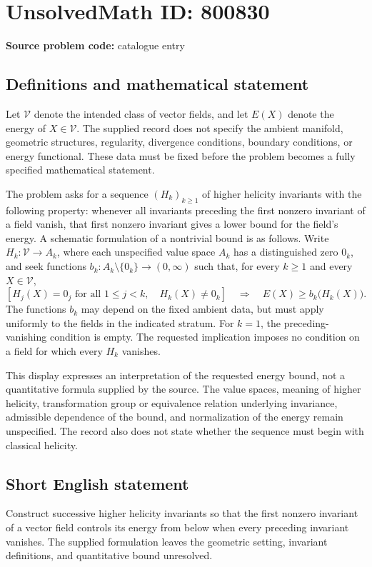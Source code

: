 \documentclass[11pt]{article}
\begin{document}
\section*{UnsolvedMath ID: 800830}
\textbf{Source problem code:} catalogue entry
\subsection{Definitions and mathematical statement}
Let \(\mathcal V\) denote the intended class of vector fields, and let \(E(X)\) denote the energy of \(X\in\mathcal V\). The supplied record does not specify the ambient manifold, geometric structures, regularity, divergence conditions, boundary conditions, or energy functional. These data must be fixed before the problem becomes a fully specified mathematical statement.

The problem asks for a sequence \((H_k)_{k\geq 1}\) of higher helicity invariants with the following property: whenever all invariants preceding the first nonzero invariant of a field vanish, that first nonzero invariant gives a lower bound for the field's energy. A schematic formulation of a nontrivial bound is as follows. Write \(H_k:\mathcal V\to A_k\), where each unspecified value space \(A_k\) has a distinguished zero \(0_k\), and seek functions \(b_k:A_k\setminus\{0_k\}\to(0,\infty)\) such that, for every \(k\geq 1\) and every \(X\in\mathcal V\),
\[
\left[H_j(X)=0_j\text{ for all }1\leq j<k,\quad H_k(X)\neq 0_k\right]
\quad\Longrightarrow\quad
E(X)\geq b_k\bigl(H_k(X)\bigr).
\]
The functions \(b_k\) may depend on the fixed ambient data, but must apply uniformly to the fields in the indicated stratum. For \(k=1\), the preceding-vanishing condition is empty. The requested implication imposes no condition on a field for which every \(H_k\) vanishes.

This display expresses an interpretation of the requested energy bound, not a quantitative formula supplied by the source. The value spaces, meaning of higher helicity, transformation group or equivalence relation underlying invariance, admissible dependence of the bound, and normalization of the energy remain unspecified. The record also does not state whether the sequence must begin with classical helicity.
\subsection{Short English statement}
Construct successive higher helicity invariants so that the first nonzero invariant of a vector field controls its energy from below when every preceding invariant vanishes. The supplied formulation leaves the geometric setting, invariant definitions, and quantitative bound unresolved.
\end{document}
